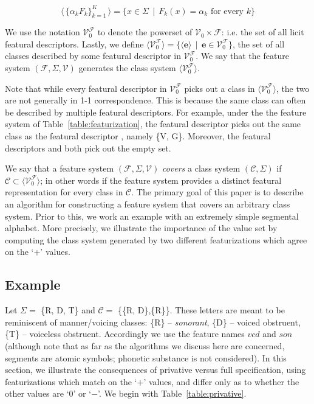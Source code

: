 \documentclass[11pt, oneside]{article}   	%
\begin{document}
$$ \Bigg \langle \, \{\alpha_k F_k\}_{k=1}^K \, \Bigg \rangle = \{x \in \Sigma \, \mid \, F_k(x) = \alpha_k \text{ for every } k \} $$

\vspace{\baselineskip} \noindent We use the notation $\mathcal V_0^\mathcal F$ to denote the powerset of $\mathcal V_0 \times \mathcal F$: i.e. the set of all licit featural descriptors. Lastly, we define $\langle \mathcal V_0^\mathcal F \rangle = \{ \langle \mathbf{e} \rangle \, \mid \, \mathbf{e} \in \mathcal V_0^\mathcal F \}$, the set of all classes described by some featural descriptor in $\mathcal V_0^\mathcal F$. We say that the feature system $(\mathcal F, \Sigma, \mathcal V)$ generates the class system $\langle \mathcal V_0^\mathcal F \rangle$.

Note that while every featural descriptor in $\mathcal V_0^\mathcal F$ picks out a class in $\langle \mathcal V_0^\mathcal F \rangle$, the two are not generally in 1-1 correspondence. This is because the same class can often be described by multiple featural descriptors. For example, under the the feature system of Table~\ref{table:featurization}, the featural descriptor  picks out the same class as the featural descriptor , namely \{V, G\}. Moreover, the featural descriptors  and  both pick out the empty set.

\vspace{\baselineskip} We say that a feature system $(\mathcal F, \Sigma, \mathcal V)$ \textit{covers} a class system $(\mathcal C, \Sigma)$ if $\mathcal C \subset \langle \mathcal V_0^\mathcal F \rangle$; in other words if the feature system provides a distinct featural representation for every class in $\mathcal C$. The primary goal of this paper is to describe an algorithm for constructing a feature system that covers an arbitrary class system. Prior to this, we work an example with an extremely simple segmental alphabet. More precisely, we illustrate the importance of the value set by computing the class system generated by two different featurizations which agree on the `+' values.

\subsection{Example}

Let $\Sigma =$ \{R, D, T\} and $\mathcal{C} = $ \{\{R, D\},\{R\}\}. These letters are meant to be reminiscent of manner/voicing classes: \{R\} -- \textit{sonorant}, \{D\} -- voiced obstruent, \{T\} -- voiceless obstruent. Accordingly we use the feature names $vcd$ and $son$ (although note that as far as the algorithms we discuss here are concerned, segments are atomic symbols; phonetic substance is not considered). In this section, we illustrate the consequences of privative versus full specification, using featurizations which match on the `$+$' values, and differ only as to whether the other values are `$0$' or `$-$'. We begin with Table~\ref{table:privative}.
\end{document}
